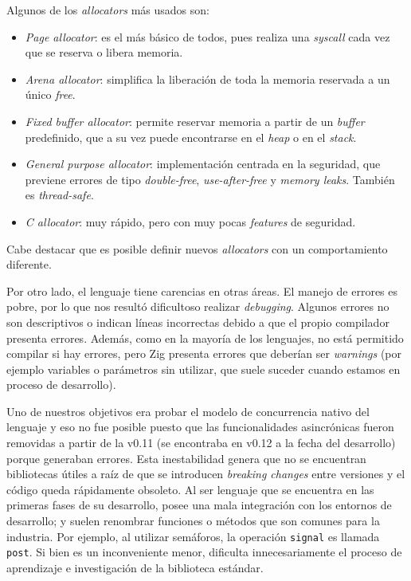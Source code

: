 \documentclass[11pt]{article}
\newcommand{\english}[1]{\textit{#1}}
\begin{document}
Algunos de los \english{allocators} más usados son:

\begin{itemize}
    \item \english{Page allocator}: es el más básico de todos, pues realiza una \english{syscall} cada vez que se reserva o libera memoria.
    \item \english{Arena allocator}: simplifica la liberación de toda la memoria reservada a un único \english{free}.
    \item \english{Fixed buffer allocator}: permite reservar memoria a partir de un \english{buffer} predefinido, que a su vez puede encontrarse en el \english{heap} o en el \english{stack}.
    \item \english{General purpose allocator}: implementación centrada en la seguridad, que previene errores de tipo \english{double-free}, \english{use-after-free} y \english{memory leaks}. También es \english{thread-safe}.
    \item \english{C allocator}: muy rápido, pero con muy pocas \english{features} de seguridad.
\end{itemize}

Cabe destacar que es posible definir nuevos \english{allocators} con un comportamiento diferente.

Por otro lado, el lenguaje tiene carencias en otras áreas. El manejo de errores es pobre, por lo que nos resultó dificultoso realizar \english{debugging}. Algunos errores no son descriptivos o indican líneas incorrectas debido a que el propio compilador presenta errores. Además, como en la mayoría de los lenguajes, no está permitido compilar si hay errores, pero Zig presenta errores que deberían ser \english{warnings} (por ejemplo variables o parámetros sin utilizar, que suele suceder cuando estamos en proceso de desarrollo). 

Uno de nuestros objetivos era probar el modelo de concurrencia nativo del lenguaje y eso no fue posible puesto que las funcionalidades asincrónicas fueron removidas a partir de la v0.11 (se encontraba en v0.12 a la fecha del desarrollo) porque generaban errores. Esta inestabilidad genera que no se encuentran bibliotecas útiles a raíz de que se introducen \english{breaking changes} entre versiones y el código queda rápidamente obsoleto. Al ser lenguaje que se encuentra en las primeras fases de su desarrollo, posee una mala integración con los entornos de desarrollo; y suelen renombrar funciones o métodos que son comunes para la industria. Por ejemplo, al utilizar semáforos, la operación \lstinline{signal} es llamada \lstinline{post}. Si bien es un inconveniente menor, dificulta innecesariamente el proceso de aprendizaje e investigación de la biblioteca estándar.
\end{document}
